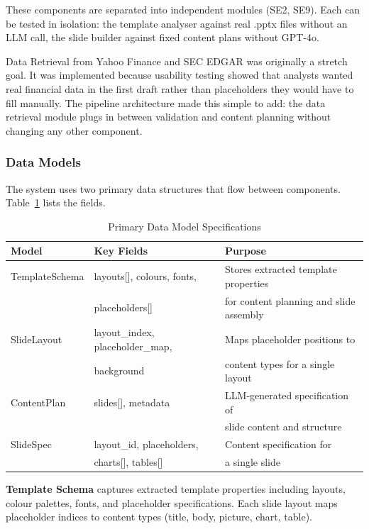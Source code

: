 These components are separated into independent modules (SE2, SE9). Each can be tested in isolation: the template analyser against real .pptx files without an LLM call, the slide builder against fixed content plans without GPT-4o.

Data Retrieval from Yahoo Finance and SEC EDGAR was originally a stretch goal. It was implemented because usability testing showed that analysts wanted real financial data in the first draft rather than placeholders they would have to fill manually. The pipeline architecture made this simple to add: the data retrieval module plugs in between validation and content planning without changing any other component.

\subsubsection{Data Models}

The system uses two primary data structures that flow between components. Table~\ref{tab:data-models} lists the fields.

\begin{table}[H]
\centering
\begin{tabular}{|l|l|l|}
\hline
\rowcolor{gray!20} \textbf{Model} & \textbf{Key Fields} & \textbf{Purpose} \\
\hline
TemplateSchema & layouts[], colours, fonts, & Stores extracted template properties \\
 & placeholders[] & for content planning and slide assembly \\
\hline
SlideLayout & layout\_index, placeholder\_map, & Maps placeholder positions to \\
 & background & content types for a single layout \\
\hline
ContentPlan & slides[], metadata & LLM-generated specification of \\
 & & slide content and structure \\
\hline
SlideSpec & layout\_id, placeholders, & Content specification for \\
 & charts[], tables[] & a single slide \\
\hline
\end{tabular}
\caption{Primary Data Model Specifications}
\label{tab:data-models}
\end{table}

\textbf{Template Schema} captures extracted template properties including layouts, colour palettes, fonts, and placeholder specifications. Each slide layout maps placeholder indices to content types (title, body, picture, chart, table).

